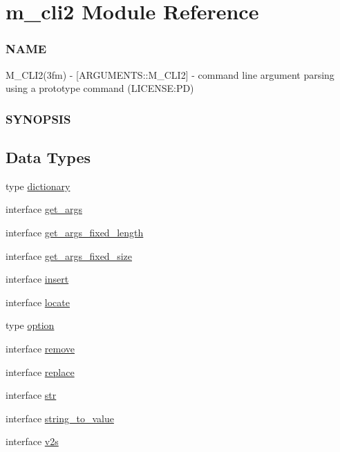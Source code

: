 \hypertarget{namespacem__cli2}{}\section{m\+\_\+cli2 Module Reference}
\label{namespacem__cli2}


\subsubsection*{N\+A\+ME}

M\+\_\+\+C\+L\+I2(3fm) -\/ \mbox{[}A\+R\+G\+U\+M\+E\+N\+T\+S\+::\+M\+\_\+\+C\+L\+I2\mbox{]} -\/ command line argument parsing using a prototype command (L\+I\+C\+E\+N\+SE\+:PD) \subsubsection*{S\+Y\+N\+O\+P\+S\+IS} 


\subsection*{Data Types}
\begin{DoxyCompactItemize}
\item 
type \mbox{\hyperlink{structm__cli2_1_1dictionary}{dictionary}}
\item 
interface \mbox{\hyperlink{interfacem__cli2_1_1get__args}{get\+\_\+args}}
\item 
interface \mbox{\hyperlink{interfacem__cli2_1_1get__args__fixed__length}{get\+\_\+args\+\_\+fixed\+\_\+length}}
\item 
interface \mbox{\hyperlink{interfacem__cli2_1_1get__args__fixed__size}{get\+\_\+args\+\_\+fixed\+\_\+size}}
\item 
interface \mbox{\hyperlink{interfacem__cli2_1_1insert}{insert}}
\item 
interface \mbox{\hyperlink{interfacem__cli2_1_1locate}{locate}}
\item 
type \mbox{\hyperlink{structm__cli2_1_1option}{option}}
\item 
interface \mbox{\hyperlink{interfacem__cli2_1_1remove}{remove}}
\item 
interface \mbox{\hyperlink{interfacem__cli2_1_1replace}{replace}}
\item 
interface \mbox{\hyperlink{interfacem__cli2_1_1str}{str}}
\item 
interface \mbox{\hyperlink{interfacem__cli2_1_1string__to__value}{string\+\_\+to\+\_\+value}}
\item 
interface \mbox{\hyperlink{interfacem__cli2_1_1v2s}{v2s}}
\end{DoxyCompactItemize}
